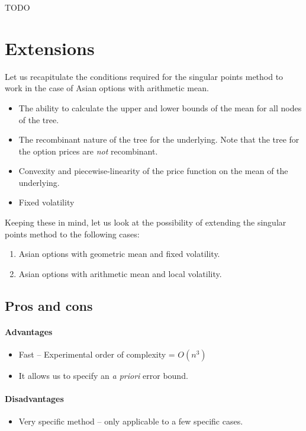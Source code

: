 \begin{lmm}[Lemma 4]
	TODO
\end{lmm}


\section{Extensions}
\label{sec:extensions}

Let us recapitulate the conditions required for the singular points method to work in the case of Asian options with arithmetic mean.
\begin{itemize}
\item The ability to calculate the upper and lower bounds of the mean for all nodes of the tree.
\item The recombinant nature of the tree for the underlying. Note that the tree for the option prices are \emph{not} recombinant.
\item Convexity and piecewise-linearity of the price function on the mean of the underlying.
\item Fixed volatility
\end{itemize}

Keeping these in mind, let us look at the possibility of extending the singular points method to the following cases:
\begin{enumerate}
\item Asian options with geometric mean and fixed volatility.
\item Asian options with arithmetic mean and local volatility.
\end{enumerate}


\subsection{Pros and cons}
\label{sec:sp-adv}

\paragraph{Advantages}
\begin{itemize}
\item Fast -- Experimental order of complexity = $ O(n^3) $
\item It allows us to specify an \emph{a priori} error bound.
\end{itemize}


\paragraph{Disadvantages}
\begin{itemize}
\item Very specific method -- only applicable to a few specific cases.
\end{itemize}


